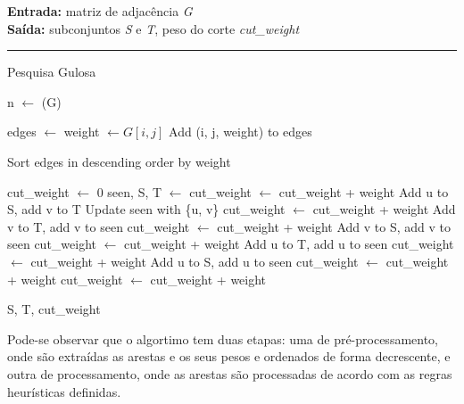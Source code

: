 \documentclass[mirror, portugues]{revdetua}
\begin{document}
\begin{algorithm}[H]
    \raggedright
    \textbf{Entrada:} matriz de adjacência \textit{G} \\
    \textbf{Saída:} subconjuntos \textit{S} e \textit{T}, peso do corte \textit{cut\_weight} \\
    \hrule 
    \caption{Pesquisa Gulosa}
    \begin{algorithmic}[1]
    
        \State n $\gets$ (G)

        \State edges $\gets$ 
                \State weight $\gets G[i, j]$
                \State Add (i, j, weight) to edges
            \EndFor
        \EndFor

        \State Sort edges in descending order by weight

        \State cut\_weight $\gets$ 0
        \State seen, S, T $\gets$ 
                \State cut\_weight $\gets$ cut\_weight + weight
                \State Add u to S, add v to T
                \State Update seen with \{u, v\}
                \State cut\_weight $\gets$ cut\_weight + weight
                \State Add v to T, add v to seen
                \State cut\_weight $\gets$ cut\_weight + weight
                \State Add v to S, add v to seen
                \State cut\_weight $\gets$ cut\_weight + weight
                \State Add u to T, add u to seen
                \State cut\_weight $\gets$ cut\_weight + weight
                \State Add u to S, add u to seen
                \State cut\_weight $\gets$ cut\_weight + weight
            \State cut\_weight $\gets$ cut\_weight + weight
            \Else
            \EndIf
        \EndFor

        \State \Return S, T, cut\_weight
    
    \end{algorithmic}
\end{algorithm}

Pode-se observar que o algortimo tem duas etapas: uma de pré-processamento, onde são extraídas as arestas e os seus pesos e ordenados de forma decrescente, e outra de processamento, onde as arestas são processadas de acordo com as regras heurísticas definidas.
\end{document}
